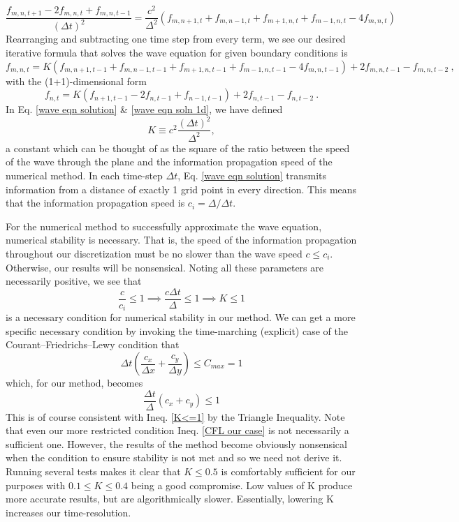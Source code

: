 \documentclass{article}
\begin{document}
\begin{equation*}
\frac{f_{m,n,t+1}-2f_{m,n,t}+f_{m,n,t-1}}{(\Delta t)^2}=\frac{c^2}{\Delta^2}(f_{m,n+1,t}+f_{m,n-1,t}+f_{m+1,n,t}+f_{m-1,n,t}-4f_{m,n,t})
\end{equation*}
Rearranging and subtracting one time step from every term, we see our desired iterative formula that solves the wave equation for given boundary conditions is
\begin{equation} \label{wave eqn solution}
\boxed{f_{m,n,t}=K(f_{m,n+1,t-1}+f_{m,n-1,t-1}+f_{m+1,n,t-1}+f_{m-1,n,t-1}-4f_{m,n,t-1})+2f_{m,n,t-1}-f_{m,n,t-2}}\ ,
\end{equation}
with the (1+1)-dimensional form
\begin{equation} \label{wave eqn soln 1d}
\boxed{f_{n,t}=K(f_{n+1,t-1}-2f_{n,t-1}+f_{n-1,t-1})+2f_{n,t-1}-f_{n,t-2}}\ .
\end{equation}
In Eq. \ref{wave eqn solution} \& \ref{wave eqn soln 1d}, we have defined
\begin{equation} \label{K}
K\equiv c^2\frac{(\Delta t)^2}{\Delta^2},
\end{equation}
a constant which can be thought of as the square of the ratio between the speed of the wave through the plane and the information propagation speed of the numerical method. In each time-step $\Delta t$, Eq. \ref{wave eqn solution} transmits information from a distance of exactly 1 grid point in every direction. This means that the information propagation speed is $c_{i}=\Delta / \Delta t$.

For the numerical method to successfully approximate the wave equation, numerical stability is necessary. That is, the speed of the information propagation throughout our discretization must be no slower than the wave speed $c\leq c_i$. Otherwise, our results will be nonsensical. Noting all these parameters are necessarily positive, we see that
\begin{equation} \label{K<=1}
\frac{c}{c_i}\leq 1 \implies \frac{c\Delta t}{\Delta}\leq 1 \implies K\leq 1
\end{equation}
is a necessary condition for numerical stability in our method. We can get a more specific necessary condition by invoking the time-marching (explicit) case of the Courant--Friedrichs--Lewy condition that
\begin{equation}
\Delta t\left(\frac{c_x}{\Delta x}+\frac{c_y}{\Delta y}\right)\leq C_{max}=1
\end{equation}
which, for our method, becomes
\begin{equation} \label{CFL our case}
\frac{\Delta t}{\Delta}(c_x+c_y)\leq 1
\end{equation}
This is of course consistent with Ineq. \ref{K<=1} by the Triangle Inequality. Note that even our more restricted condition Ineq. \ref{CFL our case} is not necessarily a sufficient one. However, the results of the method become obviously nonsensical when the condition to ensure stability is not met and so we need not derive it. Running several tests makes it clear that $K\leq 0.5$ is comfortably sufficient for our purposes with $0.1\leq K\leq 0.4$ being a good compromise. Low values of K produce more accurate results, but are algorithmically slower. Essentially, lowering K increases our time-resolution.
\end{document}
